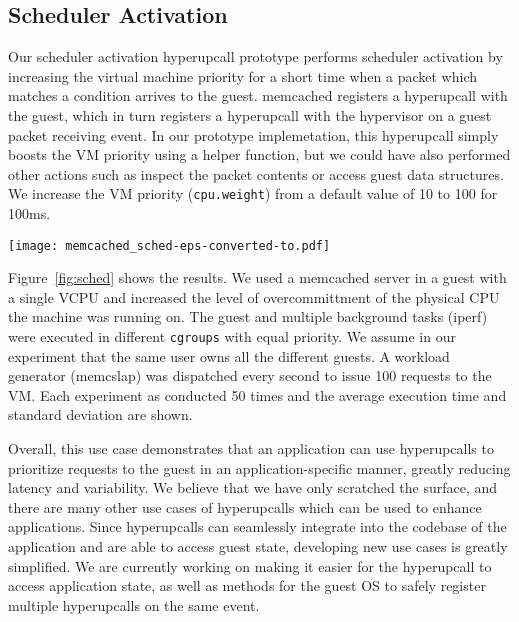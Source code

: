 \documentclass[11pt]{article}
\begin{document}
\subsection{Scheduler Activation}
Our scheduler activation hyperupcall prototype performs scheduler activation by increasing the virtual
machine priority for a short time when a packet which matches a condition arrives
to the guest. memcached registers a hyperupcall with the guest, which in turn registers a
hyperupcall with the hypervisor on a guest packet receiving event. In our prototype implemetation, 
this hyperupcall simply boosts the VM priority using a helper function, but we could have
also performed other actions such as inspect the packet contents or access guest data structures.
We increase the VM priority (\texttt{cpu.weight}) from a default value of 10 to 100 for 100ms.


\begin{figure*}
	\texttt{[image: memcached\_sched-eps-converted-to.pdf]}
	\caption{The runtime of 100 memcached requests with varying
	level of CPU overcommitment, with and without scheduler activation
	hyperupcalls. The slowdown ratio is presented above the lines.}
	\label{fig:sched}
\end{figure*}

Figure~\ref{fig:sched} shows the results. We used a memcached server in a guest with a single VCPU
and increased the level of overcommittment of the physical CPU the machine was running on.
The guest and multiple background tasks (iperf)
were executed in different \texttt{cgroups} with equal priority. We assume
in our experiment that the same user owns all the different guests. A workload generator (memcslap) was dispatched every second to issue 100 requests to the VM.
Each experiment as conducted 50 times and the average execution time and standard deviation are shown.

Overall, this use case demonstrates that an application can use hyperupcalls to prioritize requests to the
guest in an application-specific manner, greatly reducing latency and variability. We believe that we have
only scratched the surface, and there are many other use cases of hyperupcalls which can be used to enhance
applications. Since hyperupcalls can seamlessly integrate into the codebase of the application and are able to
access guest state, developing new use cases is greatly simplified. We are currently working on making
it easier for the hyperupcall to access application state, as well as methods for the guest OS to safely
register multiple hyperupcalls on the same event.
\end{document}

